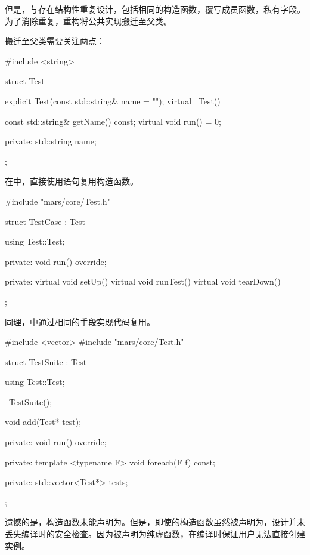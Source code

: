 \begin{content}
但是，与存在结构性重复设计，包括相同的构造函数，覆写成员函数，私有字段。为了消除重复，重构将公共实现搬迁至父类。

搬迁至父类需要关注两点：

\begin{enum}
\end{enum}

\begin{leftbar}
 \begin{c++}[caption={\ttfamily{include/mars/core/Test.h}}]
#include <string>

struct Test {
  explicit Test(const std::string& name = "");
  virtual ~Test() {}

  const std::string& getName() const;
  virtual void run() = 0;

private:
  std::string name;
};
 \end{c++}
\end{leftbar}

在中，直接使用语句复用构造函数。

\begin{leftbar}
 \begin{c++}[caption={\ttfamily{include/mars/core/TestCase.h}}]
#include "mars/core/Test.h"

struct TestCase : Test {
  using Test::Test;

private:
  void run() override;

private:
  virtual void setUp() {}
  virtual void runTest() {}
  virtual void tearDown() {}
};
 \end{c++}
\end{leftbar}

同理，中通过相同的手段实现代码复用。

\begin{leftbar}
 \begin{c++}[caption={\ttfamily{include/mars/core/TestSuite.h}}]
#include <vector>
#include "mars/core/Test.h"

struct TestSuite : Test {
  using Test::Test;

  ~TestSuite();

  void add(Test* test);

private:
  void run() override;

private:
  template <typename F>
  void foreach(F f) const;

private:
  std::vector<Test*> tests;
};
 \end{c++}
\end{leftbar}

遗憾的是，构造函数未能声明为。但是，即使的构造函数虽然被声明为，设计并未丢失编译时的安全检查。因为被声明为纯虚函数，在编译时保证用户无法直接创建实例。

\end{content}

